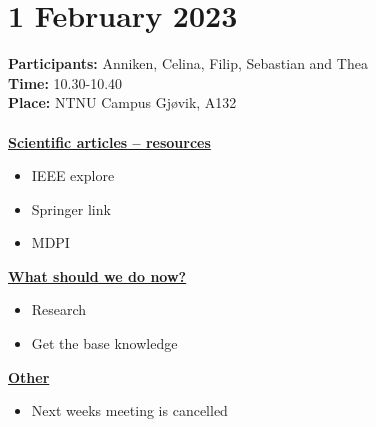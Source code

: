 \section{1 February 2023}
\textbf{Participants:} Anniken, Celina, Filip, Sebastian and Thea \\
\textbf{Time:} 10.30-10.40 \\
\textbf{Place:} NTNU Campus Gjøvik, A132
\\~\\
\textbf{\underline{Scientific articles – resources}}
\begin{itemize}
    \item IEEE explore 
    \item Springer link
    \item MDPI
\end{itemize}

\textbf{\underline{What should we do now?}}
\begin{itemize}
    \item Research
    \item Get the base knowledge
\end{itemize}

\textbf{\underline{Other}}
\begin{itemize}
    \item Next weeks meeting is cancelled
\end{itemize}
